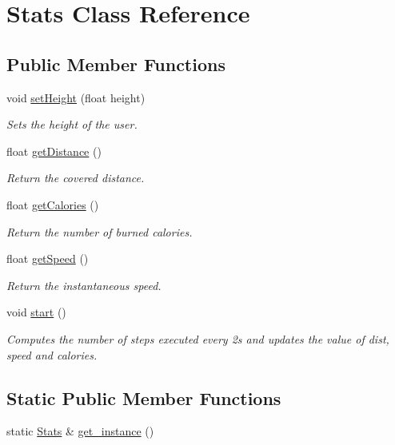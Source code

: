 \hypertarget{class_stats}{\section{Stats Class Reference}
\label{class_stats}
}
\subsection*{Public Member Functions}
\begin{DoxyCompactItemize}
\item 
void \hyperlink{class_stats_adc2e0800efca283b901000034894f2e7}{set\-Height} (float height)
\begin{DoxyCompactList}\small\item\em Sets the height of the user. \end{DoxyCompactList}\item 
float \hyperlink{class_stats_adc6730ba777937a6d12ea378b3669f3a}{get\-Distance} ()
\begin{DoxyCompactList}\small\item\em Return the covered distance. \end{DoxyCompactList}\item 
float \hyperlink{class_stats_ae03a022c02ff10c37c9eed3f31dbc944}{get\-Calories} ()
\begin{DoxyCompactList}\small\item\em Return the number of burned calories. \end{DoxyCompactList}\item 
float \hyperlink{class_stats_ad35492d7dbf7e7e6b82ca0d2ca263813}{get\-Speed} ()
\begin{DoxyCompactList}\small\item\em Return the instantaneous speed. \end{DoxyCompactList}\item 
void \hyperlink{class_stats_a80e362f9e221e3e6e9b8fc5cbae2e88f}{start} ()
\begin{DoxyCompactList}\small\item\em Computes the number of steps executed every 2s and updates the value of dist, speed and calories. \end{DoxyCompactList}\end{DoxyCompactItemize}
\subsection*{Static Public Member Functions}
\begin{DoxyCompactItemize}
\item 
static \hyperlink{class_stats}{Stats} \& \hyperlink{class_stats_a6f2ddc30586646c537c3b66d7d962561}{get\-\_\-instance} ()
\end{DoxyCompactItemize}


